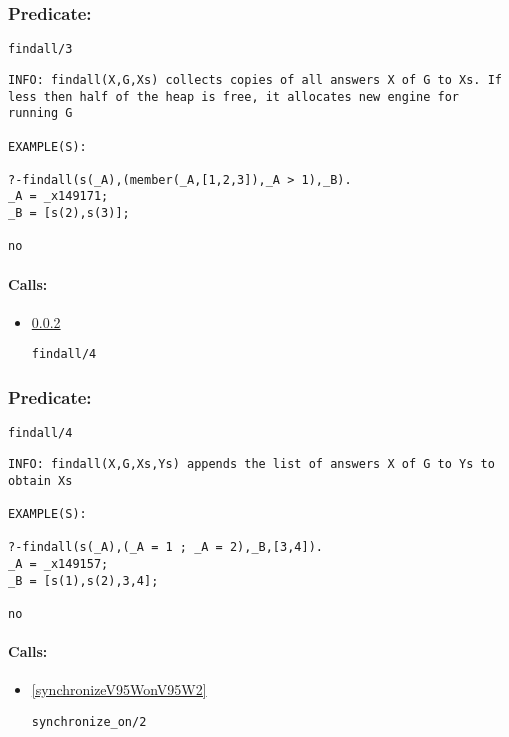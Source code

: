 \subsubsection{Predicate:} \label{findallV95W3}

\begin{verbatim}
findall/3
\end{verbatim}

{\small \begin{verbatim}
INFO: findall(X,G,Xs) collects copies of all answers X of G to Xs. If less then half of the heap is free, it allocates new engine for running G

EXAMPLE(S):

?-findall(s(_A),(member(_A,[1,2,3]),_A > 1),_B).
_A = _x149171;
_B = [s(2),s(3)];

no

\end{verbatim}}
\paragraph{Calls:} 
\begin{itemize}
\item \ref{findallV95W4} 
\begin{verbatim}
findall/4
\end{verbatim}

\end{itemize}

\subsubsection{Predicate:} \label{findallV95W4}

\begin{verbatim}
findall/4
\end{verbatim}

{\small \begin{verbatim}
INFO: findall(X,G,Xs,Ys) appends the list of answers X of G to Ys to obtain Xs

EXAMPLE(S):

?-findall(s(_A),(_A = 1 ; _A = 2),_B,[3,4]).
_A = _x149157;
_B = [s(1),s(2),3,4];

no

\end{verbatim}}
\paragraph{Calls:} 
\begin{itemize}
\item \ref{synchronizeV95WonV95W2} 
\begin{verbatim}
synchronize_on/2
\end{verbatim}

\end{itemize}
